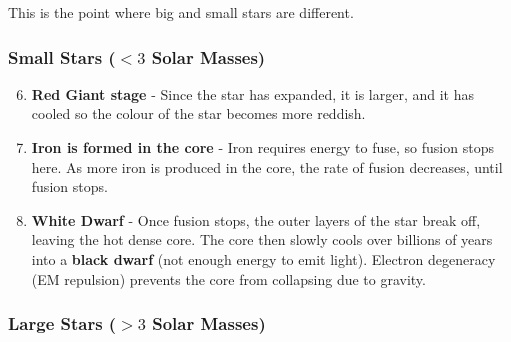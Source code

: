 \documentclass[a4paper, 12pt]{article}
\begin{document}
This is the point where big and small stars are different.

\subsubsection{Small Stars ($< 3$ Solar Masses)}

\begin{enumerate}
	\setcounter{enumi}{5}

	\item \textbf{Red Giant stage} - Since the star has expanded, it is larger, and it has cooled so the colour of the star becomes more reddish.

	\item \textbf{Iron is formed in the core} - Iron requires energy to fuse, so fusion stops here. As more iron is produced in the core, the rate of fusion decreases, until fusion stops.

	\item \textbf{White Dwarf} - Once fusion stops, the outer layers of the star break off, leaving the hot dense core. The core then slowly cools over billions of years into a \textbf{black dwarf} (not enough energy to emit light). Electron degeneracy (EM repulsion) prevents the core from collapsing due to gravity.
\end{enumerate}

\subsubsection{Large Stars ($> 3$ Solar Masses)}
\end{document}
